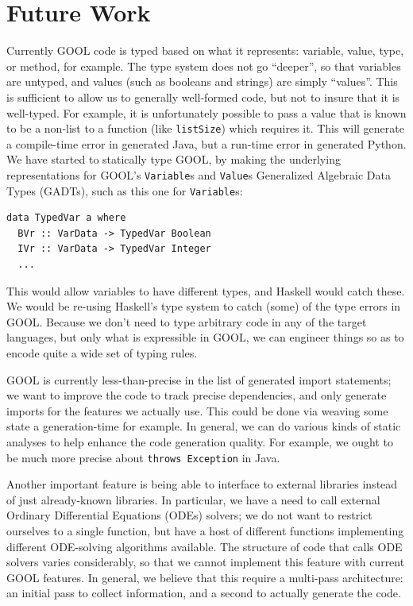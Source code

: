 \documentclass[sigplan,review,anonymous,prologue,dvipsnames]{acmart}
\begin{document}
\section{Future Work} \label{sec:future}

Currently GOOL code is typed based on what it represents:
variable, value, type, or method, for example. The type system does not
go ``deeper'', so that variables are untyped, and values (such as booleans
and strings) are simply ``values''.  This is sufficient to allow us to
generally well-formed code, but not to insure that it is well-typed.
For example, it is unfortunately possible to pass a value that is known
to be a non-list to a function (like \verb|listSize|) which requires it.
This will generate a compile-time error in generated Java, but a run-time error
in generated Python.  We have started to statically type GOOL, by making
the underlying representations for 
GOOL's \verb|Variable|s and \verb|Value|s Generalized Algebraic Data Types
(GADTs), such as this one for \verb|Variable|s:
\begin{lstlisting}
data TypedVar a where
  BVr :: VarData -> TypedVar Boolean
  IVr :: VarData -> TypedVar Integer
  ...
\end{lstlisting}
This would allow variables to have different types, and Haskell would catch
these. We would be re-using Haskell's type system to catch (some) of the
type errors in GOOL.  Because we don't need to type arbitrary code in any
of the target languages, but only what is expressible in GOOL, we can
engineer things so as to encode quite a wide set of typing rules.

GOOL is currently less-than-precise in the list of generated import statements;
we want to improve the code to track precise dependencies, and only generate
imports for the features we actually use. This could be done via weaving
some state a generation-time for example.  In general, we can do various 
kinds of static analyses to help enhance the code generation quality.
For example, we ought to be much more precise about \verb|throws Exception|
in Java.

Another important feature is being able to interface to external libraries
instead of just already-known libraries. In particular, we have a need to
call external Ordinary Differential Equations (ODEs) solvers; we do not
want to restrict ourselves to a single function, but have a host of
different functions implementing different ODE-solving algorithms available.
The structure of code that calls ODE solvers varies considerably, so that we cannot
implement this feature with current GOOL features.  In general, we believe
that this require a multi-pass architecture: an initial pass to collect
information, and a second to actually generate the code.
\end{document}
